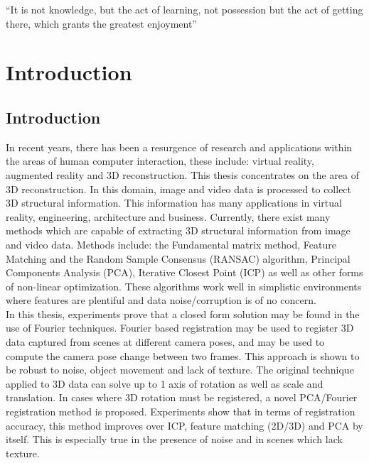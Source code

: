 \begin{savequote}[8cm]
  ``It is not knowledge, but the act of learning, not possession but the act of getting there, which grants the greatest enjoyment''
\end{savequote}
\makeatletter
\chapter{Introduction}


\section{Introduction}

In recent years, there has been a resurgence of research and applications within the areas of human computer interaction, these include: virtual reality, augmented reality and 3D reconstruction. This thesis concentrates on the area of 3D reconstruction. In this domain, image and video data is processed to collect 3D structural information. This information has many applications in virtual reality, engineering, architecture and business. Currently, there exist many methods which are capable of extracting 3D structural information from image and video data. Methods include: the Fundamental matrix method, Feature Matching and the Random Sample Consensus (RANSAC) algorithm, Principal Components Analysis (PCA), Iterative Closest Point (ICP) as well as other forms of non-linear optimization. These algorithms work well in simplistic environments where features are plentiful and data noise/corruption is of no concern. \\

In this thesis, experiments prove that a closed form solution may be found in the use of Fourier techniques. Fourier based registration may be used to register 3D data captured from scenes at different camera poses, and may be used to compute the camera pose change between two frames. This approach is shown to be robust to noise, object movement and lack of texture. The original technique applied to 3D data can solve up to 1 axis of rotation as well as scale and translation. In cases where 3D rotation must be registered, a novel PCA/Fourier registration method is proposed. Experiments show that in terms of registration accuracy, this method improves over ICP, feature matching (2D/3D) and PCA by itself. This is especially true in the presence of noise and in scenes which lack texture. \\

